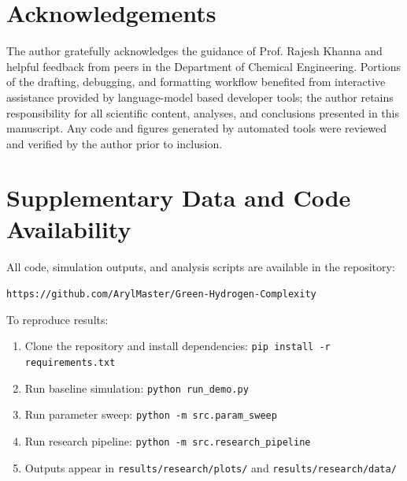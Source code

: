 \documentclass[12pt,a4paper,twoside]{report}
\begin{document}
\newpage

\chapter*{Acknowledgements}

The author gratefully acknowledges the guidance of Prof. Rajesh Khanna and helpful feedback from peers in the Department of Chemical Engineering. Portions of the drafting, debugging, and formatting workflow benefited from interactive assistance provided by language-model based developer tools; the author retains responsibility for all scientific content, analyses, and conclusions presented in this manuscript. Any code and figures generated by automated tools were reviewed and verified by the author prior to inclusion.

\renewcommand{\bibname}{References}



\appendix

\chapter{Supplementary Data and Code Availability}

All code, simulation outputs, and analysis scripts are available in the repository:
\begin{center}
\texttt{https://github.com/ArylMaster/Green-Hydrogen-Complexity}
\end{center}

To reproduce results:
\begin{enumerate}
\item Clone the repository and install dependencies: \texttt{pip install -r requirements.txt}
\item Run baseline simulation: \texttt{python run\_demo.py}
\item Run parameter sweep: \texttt{python -m src.param\_sweep}
\item Run research pipeline: \texttt{python -m src.research\_pipeline}
\item Outputs appear in \texttt{results/research/plots/} and \texttt{results/research/data/}
\end{enumerate}
\end{document}
